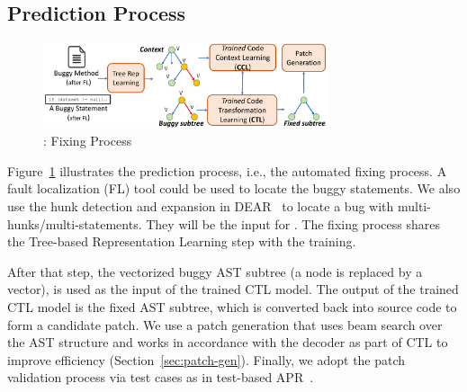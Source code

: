 \subsection{Prediction Process}

\begin{figure}[t]
	\centering
	\includegraphics[width=3.3in]{graphs/overview-predict-4.png}
	\caption{{\tool}: Fixing Process}
        \vspace{-3pt}
	\label{overview-fixing}
\end{figure}

Figure~\ref{overview-fixing} illustrates the prediction process, i.e.,
the automated fixing process. A fault localization (FL) tool could be
used to locate the buggy statements. We also use the hunk detection
and expansion in DEAR~\cite{icse22} to locate a bug with
multi-hunks/multi-statements. They will be the input for {\tool}.
%
The fixing process shares the Tree-based Representation
Learning step with the training.

After that step, the vectorized buggy AST subtree (a node is replaced
by a vector), is used as the input of the trained CTL model. The
output of the trained CTL model is the fixed AST subtree, which is
converted back into source code to form a candidate patch. We use a
patch generation that uses beam search over the AST structure and
works in accordance with the decoder as part of CTL to improve
efficiency (Section~\ref{sec:patch-gen}). Finally, we adopt the patch
validation process via test cases as in test-based APR~\cite{icse20}.




